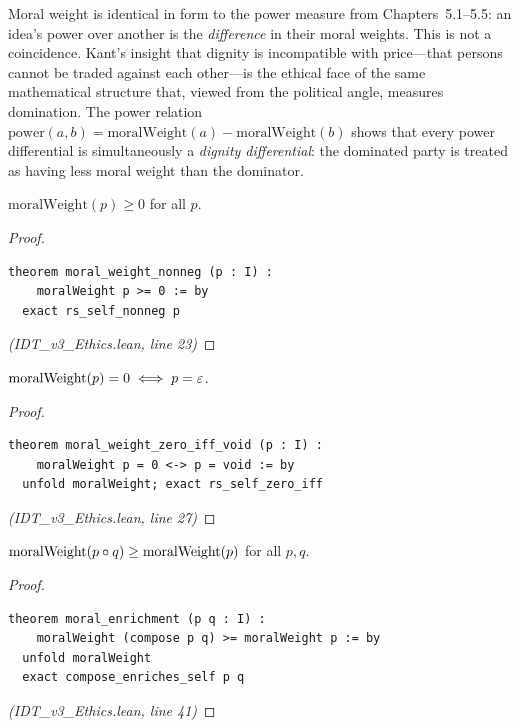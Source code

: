 \begin{remark}
Moral weight is identical in form to the power measure from
Chapters~5.1--5.5: an idea's power over another is the \emph{difference}
in their moral weights. This is not a coincidence. Kant's insight that
dignity is incompatible with price---that persons cannot be traded against
each other---is the ethical face of the same mathematical structure that,
viewed from the political angle, measures domination. The power relation
$\mathrm{power}(a,b) = \mathrm{moralWeight}(a) - \mathrm{moralWeight}(b)$
shows that every power differential is simultaneously a \emph{dignity
differential}: the dominated party is treated as having less moral weight
than the dominator.
\end{remark}

\begin{theorem}
\label{thm:moral-weight-nonneg}
$\mathrm{moralWeight}(p) \geq 0$ for all $p$.
\end{theorem}

\begin{proof}
\begin{lstlisting}
theorem moral_weight_nonneg (p : I) :
    moralWeight p >= 0 := by
  exact rs_self_nonneg p
\end{lstlisting}
\textit{(IDT\_v3\_Ethics.lean, line 23)}
\end{proof}

\begin{theorem}
\label{thm:moral-weight-void}
$\mathrm{moralWeight}(p) = 0 \iff p = \varepsilon$.
\end{theorem}

\begin{proof}
\begin{lstlisting}
theorem moral_weight_zero_iff_void (p : I) :
    moralWeight p = 0 <-> p = void := by
  unfold moralWeight; exact rs_self_zero_iff
\end{lstlisting}
\textit{(IDT\_v3\_Ethics.lean, line 27)}
\end{proof}

\begin{theorem}
\label{thm:moral-enrichment}
$\mathrm{moralWeight}(p \circ q) \geq \mathrm{moralWeight}(p)$ for all $p, q$.
\end{theorem}

\begin{proof}
\begin{lstlisting}
theorem moral_enrichment (p q : I) :
    moralWeight (compose p q) >= moralWeight p := by
  unfold moralWeight
  exact compose_enriches_self p q
\end{lstlisting}
\textit{(IDT\_v3\_Ethics.lean, line 41)}
\end{proof}

